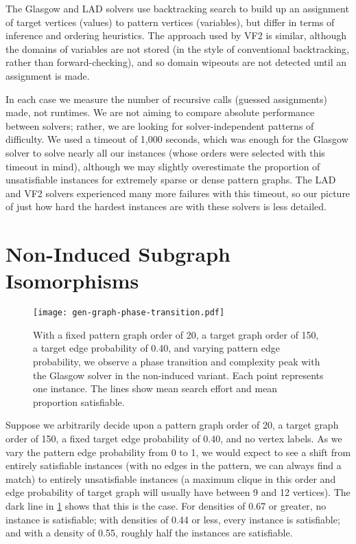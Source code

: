 \documentclass[twoside,11pt]{article}
\begin{document}
The Glasgow and LAD solvers use backtracking search to build up an assignment of target vertices
(values) to pattern vertices (variables), but differ in terms of inference and ordering heuristics.
The approach used by VF2 is similar, although the domains of variables are not stored (in the style
of conventional backtracking, rather than forward-checking), and so domain wipeouts are not detected
until an assignment is made.

In each case we measure the number of recursive calls (guessed assignments) made, not runtimes. We
are not aiming to compare absolute performance between solvers; rather, we are looking for
solver-independent patterns of difficulty. We used a timeout of 1,000 seconds, which was enough for
the Glasgow solver to solve nearly all our instances (whose orders were selected with this timeout
in mind), although we may slightly overestimate the proportion of unsatisfiable instances for
extremely sparse or dense pattern graphs. The LAD and VF2 solvers experienced many more failures
with this timeout, so our picture of just how hard the hardest instances are with these solvers is
less detailed.

\section{Non-Induced Subgraph Isomorphisms}

\begin{figure}[tb]
    \centering\texttt{[image: gen-graph-phase-transition.pdf]}
    \caption{With a fixed pattern graph order of 20, a target graph order of 150, a target edge
        probability of 0.40, and varying pattern edge probability, we observe a phase transition and
        complexity peak with the Glasgow solver in the non-induced variant. Each point represents
        one instance. The lines show mean search effort and mean proportion satisfiable.}
    \label{figure:phase-transition}
\end{figure}

Suppose we arbitrarily decide upon a pattern graph order of 20, a target graph order of 150, a fixed
target edge probability of 0.40, and no vertex labels. As we vary the pattern edge probability from
0 to 1, we would expect to see a shift from entirely satisfiable instances (with no edges in the
pattern, we can always find a match) to entirely unsatisfiable instances (a maximum clique in this
order and edge probability of target graph will usually have between 9 and 12 vertices). The dark
line in \cref{figure:phase-transition} shows that this is the case. For densities of 0.67 or
greater, no instance is satisfiable; with densities of 0.44 or less, every instance is satisfiable;
and with a density of 0.55, roughly half the instances are satisfiable.
\end{document}
